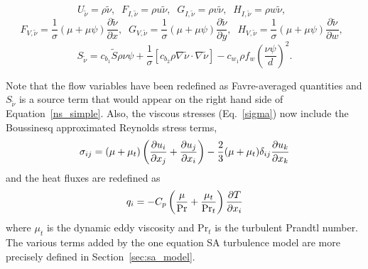 \begin{equation}
U_{\tilde\nu} = \rho\tilde\nu, \;\; 
F_{I, \tilde\nu} = \rho u \tilde\nu, \;\; 
G_{I, \tilde\nu} = \rho v \tilde\nu, \;\; 
H_{I, \tilde\nu} = \rho w \tilde\nu, \;\; 
\end{equation}
\begin{equation}
F_{V, \tilde\nu} = \frac{1}{\sigma}(\mu + \mu \psi)\frac{\partial \tilde \nu}{\partial x}, \;\;
G_{V, \tilde\nu} = \frac{1}{\sigma}(\mu + \mu \psi)\frac{\partial \tilde \nu}{\partial y}, \;\;
H_{V, \tilde\nu} = \frac{1}{\sigma}(\mu + \mu \psi)\frac{\partial \tilde \nu}{\partial w}, \;\;
\end{equation}
\begin{equation}
S_{\tilde\nu} = c_{b_1}\tilde S \rho\nu\psi + \frac{1}{\sigma}\left[c_{b_2}\rho\nabla\tilde\nu\cdot\nabla\tilde\nu\right] - c_{w_1}\rho f_w \left(\frac{\nu\psi}{d}\right)^2.
\end{equation}

Note that the flow variables have been redefined as Favre-averaged quantities and $S_{\tilde\nu}$ is a source term that would appear on the right hand side of Equation~\eqref{ns_simple}. Also, the viscous stresses (Eq.~\ref{sigma}) now include the Boussinesq approximated Reynolds stress terms,
\begin{equation}
\sigma_{ij} = (\mu+\mu_t)\left( \frac{\partial u_i}{\partial x_j}
+ \frac{\partial u_j}{\partial x_i} \right)
- \frac{2}{3}(\mu+\mu_t) \delta_{ij}\frac{\partial u_k}{\partial x_k}
\end{equation}
and the heat fluxes are redefined as
\begin{equation}
q_i = -C_p\left( \frac{\mu}{\text{Pr}} + \frac{\mu_t}{\text{Pr}_t}\right)\frac{\partial T}{\partial x_i}
\end{equation}
where $\mu_t$ is the dynamic eddy viscosity and $\text{Pr}_t$ is the turbulent Prandtl number. The various terms added by the one equation SA turbulence model are more precisely defined in Section~\ref{sec:sa_model}.
